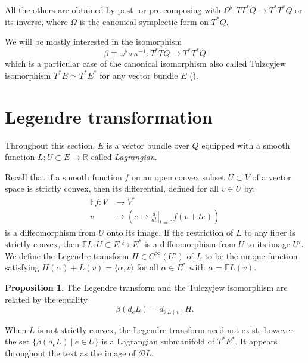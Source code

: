 \documentclass[a4paper,12pt]{amsart}
\theoremstyle{definition}
\newtheorem{Proposition}[Definition]{Proposition}
\begin{document}
All the others are obtained by post- or pre-composing with 
$\Omega^{\flat} \colon TT^*Q \to T^*T^*Q$ or its inverse, where $\Omega$ is the canonical symplectic form on $T^*Q$. 

We will be mostly interested in the isomorphism
$$\beta \equiv \omega^{\flat} \circ  \kappa^{-1} \colon T^*TQ \to T^*T^*Q$$
which is a particular case of the canonical isomorphism also called Tulzcyjew isomorphism $T^*E\simeq T^*E^*$ for any vector bundle $E$ (\cite{MackenzieXu}).



\section{Legendre transformation}

Throughout this section, $E$ is a vector bundle over {$Q$} equipped with a smooth function $ L \colon U \subset E \to \mathbb R $ called \emph{Lagrangian}.


Recall that if a smooth function $f$ on an open convex subset $U \subset V$ of a vector space is strictly convex, then its differential, defined for all $v \in U$ by:
\begin{align*}  \mathbb F f \colon V & \to V^*  
\\
v & \mapsto \left(e \mapsto \left. \frac{d}{dt}\right|_{t=0} f( v + te ) \right) \end{align*} is a diffeomorphism from $ U  $ onto its image. 
If the restriction of $L$ to any fiber is strictly convex, then $\mathbb FL: U \subset E \hookrightarrow E^*$ is a diffeomorphism from $U$ to its image $U'$. \\

We define the Legendre transform $H\in C^\infty(U')$ of $L$ to be the unique function satisfying $H(\alpha)+L(v)=\langle \alpha, v\rangle$ for all $\alpha\in E^*$ with $ \alpha=\mathbb FL(v)$.

\begin{Proposition}
The Legendre transform and the Tulczyjew isomorphism are related by the equality $$\beta(d_eL)=d_{\mathbb FL(v)}H.$$
\end{Proposition}

When $L$ is not strictly convex, the Legendre transform need not exist, however the set $\{\beta(d_eL)~|~e\in U\}$ is a Lagrangian submanifold of $T^*E^*$. It appears throughout the text as the image of $\mathcal DL$.  \\
\newpage


 

\end{document}
